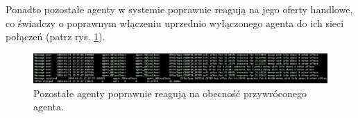 \documentclass{article}
\begin{document}
Ponadto pozostałe agenty w systemie poprawnie reagują na jego oferty handlowe, co świadczy o poprawnym włączeniu uprzednio wyłączonego agenta do ich sieci połączeń (patrz rys. \ref{reactions}).


\begin{figure}[H]
	\centering
	\includegraphics[width=\textwidth]{./png/reactions.png}
	\caption{Pozostałe agenty poprawnie reagują na obecność przywróconego agenta.}
	\label{reactions}
\end{figure}
\end{document}

